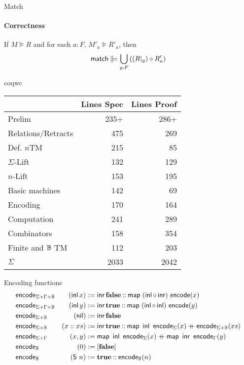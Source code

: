 \begin{frame}{Match}
  \framesubtitle{Correctness}
  \begin{lemma}
    If $M \VDash R$ and for each $a:F$, $M'_a \VDash R'_a$, then
    $$\MS{match} \VDash \bigcup_{y:F} \left( (R \at y) \circ R'_a \right)$$
  \end{lemma}
\end{frame}


\begin{frame}{coqwc}
	\begin{table}
		\begin{tabular}{|l|r|r|}
			\hline
			& Lines Spec & Lines Proof\tabularnewline
			\hline
			Prelim & 235+ & 286+\tabularnewline
			Relations/Retracts & 475 & 269\tabularnewline
			Def. $n$TM & 215 & 85\tabularnewline
			$\Sigma$-Lift & 132 & 129\tabularnewline
			$n$-Lift & 153 & 195\tabularnewline
			Basic machines & 142 & 69\tabularnewline
			Encoding & 170 & 164\tabularnewline
			Computation & 241 & 289\tabularnewline
			Combinators & 158 & 354\tabularnewline
			Finite and $\mathbb{B}$ TM & 112 & 203\tabularnewline
			\hline
			$\Sigma$ & 2033 & 2042\tabularnewline
			\hline
		\end{tabular}
	\end{table}
\end{frame}

\begin{frame}{Encoding functions}
  \footnotesize
  \begin{alignat*}{3}
    \textsf{encode}&_{\Sigma + \Gamma + \mathbb{B}}&(\operatorname{\textsf{inl}} x) &:= \operatorname{\textsf{inr}} \mathbf{false} \mathbin{::} \textsf{map}~(\operatorname{\textsf{inl}} \circ \operatorname{\textsf{inr}})~\textsf{encode}(x) \\
    \textsf{encode}&_{\Sigma + \Gamma + \mathbb{B}}&(\operatorname{\textsf{inl}} y) &:= \operatorname{\textsf{inr}} \mathbf{true}  \mathbin{::} \textsf{map}~(\operatorname{\textsf{inl}} \circ \operatorname{\textsf{inl}})~\textsf{encode}(y) \\
    \textsf{encode}&_{\Sigma + \mathbb{B}}& (\textsf{nil})         &:= \operatorname{\textsf{inr}} \mathbf{false} \\
    \textsf{encode}&_{\Sigma + \mathbb{B}}& (x :: xs)      &:= \operatorname{\textsf{inr}} \mathbf{true} \mathbin{::} \textsf{map}~\operatorname{\textsf{inl}}~\textsf{encode}_{\Sigma}(x) \mathbin{+\mkern-10mu+} \textsf{encode}_{\Sigma + \mathbb{B}}(xs) \\
    \textsf{encode}&_{\Sigma+\Gamma}   &(x,y)           &:= \textsf{map}~\operatorname{\textsf{inl}}~\textsf{encode}_{\Sigma}(x) \mathbin{+\mkern-10mu+} \textsf{map}~\operatorname{\textsf{inr}}~\textsf{encode}_{\Gamma}(y) \\
    \textsf{encode}&_{\mathbb{B}}         &(0)             &:= [\mathbf{false}] \\
    \textsf{encode}&_{\mathbb{B}}         &(\textsf{S}~n)       &:= \mathbf{true} \mathbin{::} \textsf{encode}_{\mathbb{B}}(n)
  \end{alignat*}
\end{frame}

